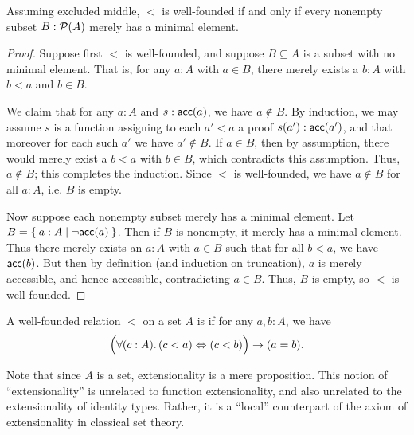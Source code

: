 \begin{lem}\label{thm:wfmin}
  Assuming excluded middle, $<$ is well-founded if and only if every nonempty subset $B: \mathcal{P}(A)$ merely has a minimal element.
\end{lem}
\begin{proof}
  Suppose first $<$ is well-founded, and suppose $B\subseteq A$ is a subset with no minimal element.
  That is, for any $a:A$ with $a\in B$, there merely exists a $b:A$ with $b<a$ and $b\in B$.

  We claim that for any $a:A$ and $s:\mathsf{acc}(a)$, we have $a\notin B$.
  By induction, we may assume $s$ is a function assigning to each $a'<a$ a proof $s(a'):\mathsf{acc}(a')$, and that moreover for each such $a'$ we have $a'\notin B$.
  If $a\in B$, then by assumption, there would merely exist a $b<a$ with $b\in B$, which contradicts this assumption.
  Thus, $a\notin B$; this completes the induction.
  Since $<$ is well-founded, we have $a\notin B$ for all $a:A$, i.e. $B$ is empty.

  Now suppose each nonempty subset merely has a minimal element.
  Let $B = \Set{ a:A | \neg \ensuremath{\mathsf{acc}}(a) }$.
  Then if $B$ is nonempty, it merely has a minimal element.
  Thus there merely exists an $a:A$ with $a\in B$ such that for all $b<a$, we have $\mathsf{acc}(b)$.
  But then by definition (and induction on truncation), $a$ is merely accessible, and hence accessible, contradicting $a\in B$.
  Thus, $B$ is empty, so $<$ is well-founded.
\end{proof}

\begin{defn}
  A well-founded relation $<$ on a set $A$ is 
  if for any $a,b:A$, we have
  \[ \Parens{\fall{c:A} (c<a) \Leftrightarrow (c<b)} \to (a=b). \]
\end{defn}

Note that since $A$ is a set, extensionality is a mere proposition.
This notion of ``extensionality'' is unrelated to function extensionality, and also unrelated to the extensionality of identity types.
%
Rather, it is a ``local'' counterpart of the axiom of extensionality in classical set theory.

